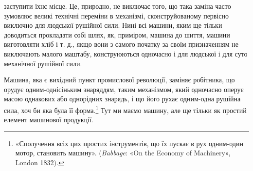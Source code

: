 \parcont{}  %
заступити їхнє місце. Це, природно, не виключає того, що така
заміна часто зумовлює великі технічні переміни в механізмі,
сконструйованому первісно виключно для людської рушійної
сили. Нині всі машини, яким ще тільки доводиться прокладати
собі шлях, як, приміром, машина до шиття, машини виготовляти
хліб і т. д., якщо вони з самого початку за своїм призначенням не
виключають малого маштабу, конструюються одночасно і для людської
і для суто механічної рушійної сили.

Машина, яка є вихідний пункт промислової революції, заміняє
робітника, що орудує одним-однісіньким знаряддям, таким механізмом,
який одночасно оперує масою однакових або однорідних
знарядь, і що його рухає одним-одна рушійна сила, хоч би яка
була її форма.\footnote{
«Сполучення всіх цих простих інструментів, що їх пускає в рух
одним-один мотор, становить машину». (\emph{Babbage}: «On the Economy
of Machinery», London 1832).
} Тут ми маємо машину, але ще тільки як простий
елемент машинової продукції.

